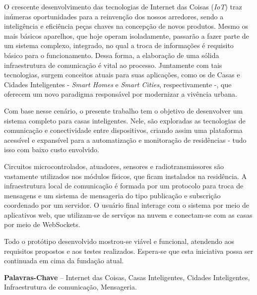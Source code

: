 \begin{resumo}
O crescente desenvolvimento das tecnologias de Internet das Coisas (\emph{IoT}) traz inúmeras oportunidades para a reinvenção dos nossos arredores, sendo a inteligência e eficiência peças chaves na concepção de novos produtos. Mesmo os mais básicos aparelhos, que hoje operam isoladamente, passarão a fazer parte de um sistema complexo, integrado, no qual a troca de informações é requisito básico para o funcionamento. Dessa forma, a elaboração de uma sólida infraestrutura de comunicação é vital ao processo. Juntamente com tais tecnologias, surgem conceitos atuais para suas aplicações, como os de Casas e Cidades Inteligentes - \textit{Smart Homes} e \textit{Smart Cities}, respectivamente -, que oferecem um novo paradigma responsável por modernizar a vivência urbana.

Com base nesse cenário, o presente trabalho tem o objetivo de desenvolver um sistema completo para casas inteligentes. Nele, são exploradas as tecnologias de comunicação e conectividade entre dispositivos, criando assim uma plataforma acessível e expansível para a automatização e monitoração de residências - tudo isso com baixo custo envolvido.

Circuitos microcontrolados, atuadores, sensores e radiotransmissores são vastamente utilizados nos módulos físicos, que ficam instalados na residência. A infraestrutura local de comunicação é formada por um protocolo para troca de mensagens e um sistema de mensageria do tipo publicação e subscrição coordenado por um servidor. O usuário final interage com o sistema por meio de aplicativos web, que utilizam-se de serviços na nuvem e conectam-se com as casas por meio de WebSockets.

Todo o protótipo desenvolvido mostrou-se viável e funcional, atendendo aos requisitos propostos e aos testes realizados. Espera-se que esta iniciativa possa ser continuada em cima da fundação atual.

%
\textbf{Palavras-Chave} -- Internet das Coisas, Casas Inteligentes, Cidades Inteligentes, Infraestrutura de comunicação, Mensageria.
\end{resumo}
